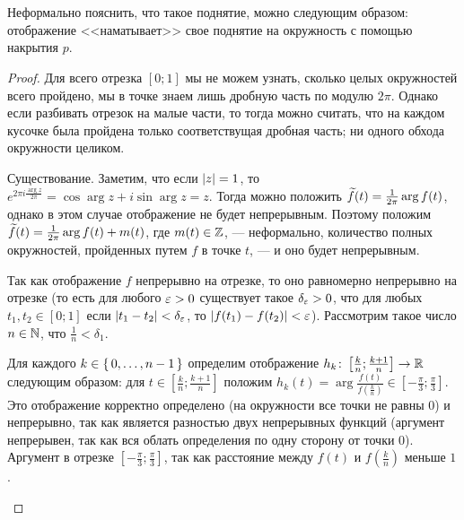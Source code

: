 \documentclass[main]{subfiles}
\begin{document}
\resetcounters

\section{}

Неформально пояснить, что такое поднятие, можно следующим образом: отображение <<наматывает>> свое поднятие на
окружность с помощью накрытия $ p $.

\LiftExists

\begin{proof}
	Для всего отрезка $ [0; 1] $ мы не можем узнать, сколько целых окружностей всего пройдено, мы в
	точке знаем лишь дробную часть по модулю $ 2 \pi $. Однако если разбивать отрезок на малые
	части, то тогда можно считать, что на каждом кусочке была пройдена только соответствущая дробная часть;
	ни одного обхода окружности целиком.
	\begin{phased}
		\item[Существование.]
			Заметим, что если $ \left\vert z\right\vert = 1 $, то
			$ e^{2 \pi i \frac{\arg z}{2 \pi}} = \cos \arg z + i \sin \arg z = z $. Тогда можно положить
			$ \widetilde{f}(t) = \frac{1}{2 \pi} \arg f(t) $, однако в этом случае отображение не будет непрерывным.
			Поэтому положим $ \widetilde{f}(t) = \frac{1}{2 \pi} \arg f(t) + m(t) $, где $ m(t) \in \mathbb{Z} $, --- неформально,
			количество полных окружностей, пройденных путем $ f $ в точке $ t $, --- и оно будет непрерывным.

			Так как отображение $ f $ непрерывно на отрезке, то оно равномерно непрерывно на
			отрезке (то есть для любого $ \varepsilon > 0 $ существует такое $ \delta_\varepsilon > 0 $, что для любых
			$ t_1, t_2 \in [0; 1] $ если $ \left\vert t_1 - t_2\right\vert < \delta_\varepsilon $, то $ \left\vert f(t_1) - f(t_2)\right\vert < \varepsilon $).
			Рассмотрим такое число $ n \in \mathbb{N} $, что $ \frac{1}{n} < \delta_1 $.

			Для каждого
			$ k \in \left\{\,0, \ldots, n - 1\,\right\} $ определим отображение
			$ h_k \colon \left[ \frac{k}{n}; \frac{k+1}{n} \right] \to \mathbb{R} $ следующим образом: для
			$ t \in \left[ \frac{k}{n}; \frac{k+1}{n} \right] $ положим
				$ h_k(t) = \arg \frac{f(t)}{f \left( \frac{k}{n} \right)}
				\in \left[ -\frac{\pi}{3}; \frac{\pi}{3} \right] $.
			Это отображение корректно определено (на окружности все точки не равны 0) и непрерывно,
			так как является разностью двух непрерывных функций (аргумент непрерывен, так как вся облать определения
			по одну сторону от точки 0). Аргумент в отрезке $ \left[ -\frac{\pi}{3}; \frac{\pi}{3} \right] $, так как
			расстояние между $ f(t) $ и $ f \left( \frac{k}{n} \right) $ меньше $ 1 $.


\end{phased}
\end{proof}
\end{document}
